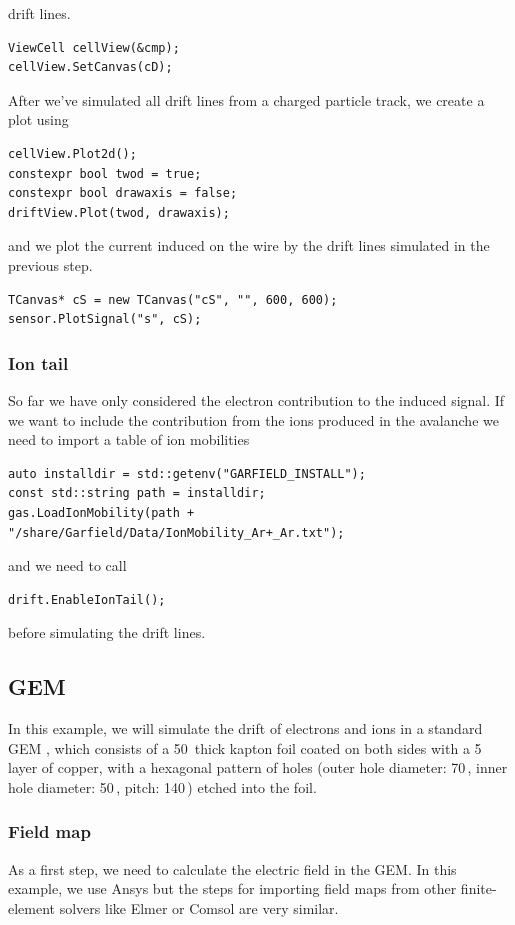 drift lines.
\begin{lstlisting}
ViewCell cellView(&cmp);
cellView.SetCanvas(cD);
\end{lstlisting}
After we've simulated all drift lines from a charged particle 
track, we create a plot using
\begin{lstlisting}
cellView.Plot2d();
constexpr bool twod = true;
constexpr bool drawaxis = false;
driftView.Plot(twod, drawaxis);
\end{lstlisting}
and we plot the current induced on 
the wire by the drift lines simulated in the previous step.
\begin{lstlisting}
TCanvas* cS = new TCanvas("cS", "", 600, 600);
sensor.PlotSignal("s", cS);
\end{lstlisting}

\subsubsection{Ion tail}
So far we have only considered the electron contribution 
to the induced signal. 
If we want to include the contribution from the ions produced in 
the avalanche we need to import a table of ion mobilities
\begin{lstlisting}
auto installdir = std::getenv("GARFIELD_INSTALL");
const std::string path = installdir;
gas.LoadIonMobility(path + "/share/Garfield/Data/IonMobility_Ar+_Ar.txt");
\end{lstlisting}
and we need to call
\begin{lstlisting}
drift.EnableIonTail();
\end{lstlisting}
before simulating the drift lines.

\subsection{GEM}\label{Sec:ExampleGem}
In this example, we will simulate the drift of electrons and ions 
in a standard GEM \cite{Sauli2016}, 
which consists of a 50\, thick kapton foil 
coated on both sides with a 5\, layer of copper, 
with a hexagonal pattern of holes (outer hole diameter: 70\,, 
inner hole diameter: 50\,, pitch: 140\,) 
etched into the foil.
\subsubsection{Field map}
As a first step, we need to calculate the electric field in the GEM. 
In this example, we use Ansys \cite{ANSYS} but the steps for importing 
field maps from other finite-element solvers like
Elmer \cite{Elmer} or Comsol \cite{Comsol} are very similar.

